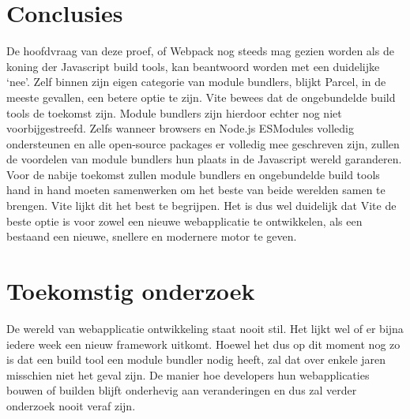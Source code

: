 \documentclass[a0,portrait]{a0poster}
\begin{document}
\begin{multicols}{2}
\section*{Conclusies}
\color{black}
De hoofdvraag van deze proef, of Webpack nog steeds mag gezien worden als de koning der Javascript build tools, kan beantwoord worden met een duidelijke ‘nee’. Zelf binnen zijn eigen categorie van module bundlers, blijkt Parcel, in de meeste gevallen, een betere optie te zijn. Vite bewees dat de ongebundelde build tools de toekomst zijn. Module bundlers zijn hierdoor echter nog niet voorbijgestreefd. Zelfs wanneer browsers en Node.js ESModules volledig ondersteunen en alle open-source packages er volledig mee geschreven zijn, zullen de voordelen van module bundlers hun plaats in de Javascript wereld garanderen. Voor de nabije toekomst zullen module bundlers en ongebundelde build tools hand in hand moeten samenwerken om het beste van beide werelden samen te brengen. Vite lijkt dit het best te begrijpen. Het is dus wel duidelijk dat Vite de beste optie is voor zowel een nieuwe webapplicatie te ontwikkelen, als een bestaand een nieuwe, snellere en modernere motor te geven.
\color{HoGentAccent1} 
\section*{Toekomstig onderzoek}
\color{black}

De wereld van webapplicatie ontwikkeling staat nooit stil. Het lijkt wel of er bijna iedere week een nieuw framework uitkomt. Hoewel het dus op dit moment nog zo is dat een build tool een module bundler nodig heeft, zal dat over enkele jaren misschien niet het geval zijn. De manier hoe developers hun webapplicaties bouwen of builden blijft onderhevig aan veranderingen en dus zal verder onderzoek nooit veraf zijn.


\end{multicols}
\end{document}
